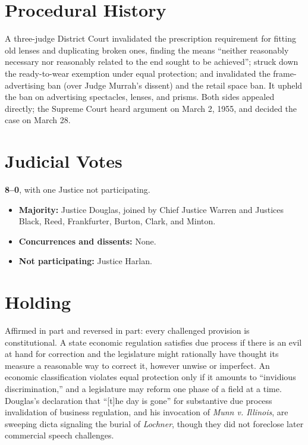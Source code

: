 \documentclass[12pt]{article}
\begin{document}
\section{Procedural History}

A three-judge District Court invalidated the prescription requirement for fitting old lenses and duplicating broken ones, finding the means ``neither reasonably necessary nor reasonably related to the end sought to be achieved''; struck down the ready-to-wear exemption under equal protection; and invalidated the frame-advertising ban (over Judge Murrah's dissent) and the retail space ban. It upheld the ban on advertising spectacles, lenses, and prisms. Both sides appealed directly; the Supreme Court heard argument on March 2, 1955, and decided the case on March 28.

\section{Judicial Votes}

\textbf{8--0}, with one Justice not participating.
\begin{itemize}
\item \textbf{Majority:} Justice Douglas, joined by Chief Justice Warren and Justices Black, Reed, Frankfurter, Burton, Clark, and Minton.
\item \textbf{Concurrences and dissents:} None.
\item \textbf{Not participating:} Justice Harlan.
\end{itemize}

\section{Holding}

Affirmed in part and reversed in part: every challenged provision is constitutional. A state economic regulation satisfies due process if there is an evil at hand for correction and the legislature might rationally have thought its measure a reasonable way to correct it, however unwise or imperfect. An economic classification violates equal protection only if it amounts to ``invidious discrimination,'' and a legislature may reform one phase of a field at a time. Douglas's declaration that ``[t]he day is gone'' for substantive due process invalidation of business regulation, and his invocation of \textit{Munn v. Illinois}, are sweeping dicta signaling the burial of \textit{Lochner}, though they did not foreclose later commercial speech challenges.
\end{document}
